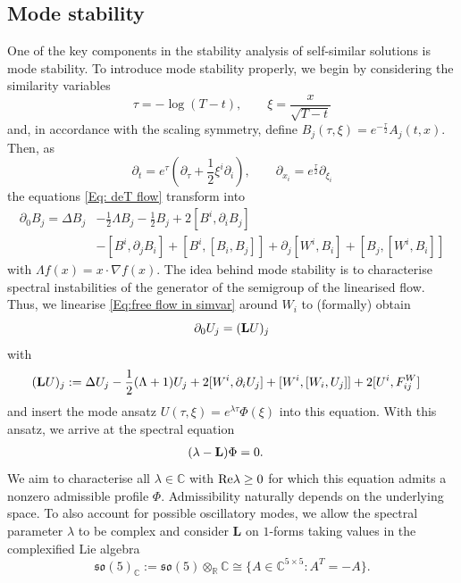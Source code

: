 \documentclass[11pt,reqno]{amsart}
\theoremstyle{remark}
\newcommand{\Lf}{\textup{\textbf{L}}}
\renewcommand{\Re}{\textup{Re}}
\theoremstyle{definition}
\begin{document}
\subsection{Mode stability}
One of the key components in the stability analysis of self-similar solutions is mode stability. To introduce mode stability properly, we begin by considering the similarity variables 
\[
\tau =-\log(T-t),\qquad \xi=\frac{x}{\sqrt{T-t}}
\]
and, in accordance with the scaling symmetry, define $B_j(\tau,\xi)=e^{-\frac{\tau}{2}} A_j(t,x)$.
Then, as
\[
\partial_t=e^{\tau} (\partial_\tau +\frac{1}{2}\xi^i\partial_i),\qquad \partial_{x_i}=e^{\frac{\tau}{2}}\partial_{\xi_i}
\]
 the equations  \eqref{Eq: deT flow} transform into
\begin{equation}\label{Eq:free flow in simvar}
\begin{split}
    \partial_0 B_j= \Delta B_j &-\frac12\Lambda B_j-\frac{1}{2}B_j+2[B^i, \partial_i B_j]
    \\
    &-[B^i, \partial_j B_i]+[B^i,[B_i,B_j]]+\partial_j[W^i,B_i]+[B_j,[W^i,B_i]]
    \end{split}
\end{equation}
with 
$\Lambda f(x)= x\cdot \nabla f(x) $. 
The idea behind mode stability is to characterise spectral instabilities of the generator of the semigroup of the linearised flow. Thus, we linearise \eqref{Eq:free flow in simvar} around 
$
W_i
$
to (formally) obtain 
\[
\partial_0 U_j =(\Lf U)_j
\]
with 
\begin{equation}\label{Eq: linearised op}
\begin{split}
        (\Lf U)_j &:=  \Delta U_j -\frac12(\Lambda+1) U_j+2[W^i, \partial_iU_j]+[W^i,[W_i,U_j]]+2[U^i,F_{ij}^W]
   \end{split}
\end{equation}
and insert the mode  ansatz $U(\tau,\xi)= e^{\lambda \tau} \Phi(\xi)$ into this equation.
With this ansatz, we arrive at the spectral equation
\begin{align*}
    (\lambda-\Lf)\Phi&=0.
\end{align*}
We aim to characterise all \(\lambda\in\mathbb C\) with \(\Re\lambda\geq0\) for which this equation admits a nonzero admissible profile \(\Phi\). Admissibility naturally depends on the underlying space.
To also account for possible oscillatory modes, we allow the spectral parameter \(\lambda\) to be complex and consider $\mathbf L$ on $1$-forms taking values in the complexified Lie algebra
\[
\mathfrak{so}(5)_{\mathbb C}
:=\mathfrak{so}(5)\otimes_{\mathbb R}\mathbb C
\cong\{A\in\mathbb C^{5\times5}:A^T=-A\}.
\]
\end{document}
